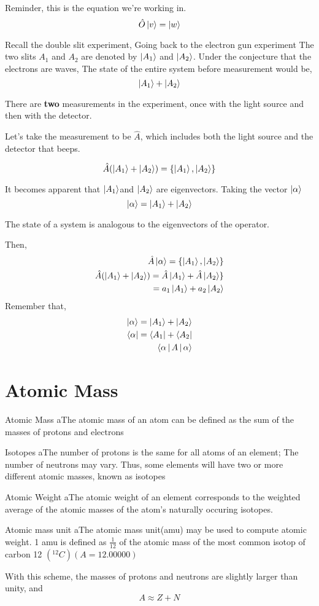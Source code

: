 \documentclass{report}
\begin{document}
Reminder, this is the equation we're working in.
$$\hat{O}\ket{v}=\ket{w}$$

Recall the double slit  experiment, Going back to the electron gun experiment The two slits $A_1$ and $A_2$ are denoted by $\ket{A_1}$ and $\ket{A_2}$. Under the conjecture that the electrons are waves, The state of the entire system before measurement would be,
$$\ket{A_1} + \ket{A_2}$$ 

There are \textbf{two} measurements in the experiment, once with the light source and then with the detector.

Let's take the measurement to be $\hat{A}$, which includes both the light source and the detector that beeps.

$$\hat{A}(\ket{A_1} + \ket{A_2}) = \{\ket{A_1}, \ket{A_2}\}$$

It becomes apparent that $\ket{A_1}$and $\ket{A_2}$ are eigenvectors. Taking the vector $\ket{\alpha}$ $$\ket{\alpha} = \ket{A_1}+\ket{A_2}$$

The state of a system is analogous to the eigenvectors of the operator.

Then,
\begin{align*}
\hat{A}\ket{\alpha} = \{\ket{A_1}, \ket{A_2}\} \\
\hat{A}(\ket{A_1} + \ket{A_2}) = \hat{A}\ket{A_1} + \hat{A} \ket{A_2}\} \\
=a_1 \ket{A_1} + a_2 \ket{A_2} \\
\end{align*}
Remember that,
\begin{align*}
\ket{\alpha} = \ket{A_1} + \ket{A_2} \\
\bra{\alpha} = \bra{A_1}+\bra{A_2} \\
\Braket{\alpha | A | \alpha} \\
\end{align*}
\section{Atomic Mass}
\begin{definition}{Atomic Mass}
	aThe atomic mass of an atom can be defined as the sum of the masses of protons and electrons
\end{definition}
\begin{definition}{Isotopes}
	aThe number of protons is the same for all atoms of an element; The number of neutrons may vary. Thus, some elements will have two or more different atomic masses, known as isotopes
\end{definition}
\begin{definition}{Atomic Weight}
	aThe atomic weight of an element corresponds to the weighted average of the atomic masses of the atom's naturally occuring isotopes.
\end{definition}
\begin{definition}{Atomic mass unit}
	aThe atomic mass unit(amu) may be used to compute atomic weight. 1 amu is defined as $\frac{1}{12}$ of the atomic mass of the most common isotop of carbon  12 $(^{12}C)(A = 12.00000)$	
\end{definition}
With this scheme, the masses of protons and neutrons are slightly larger than unity, and 
\[
	A \approx Z + N
\]
\end{document}
